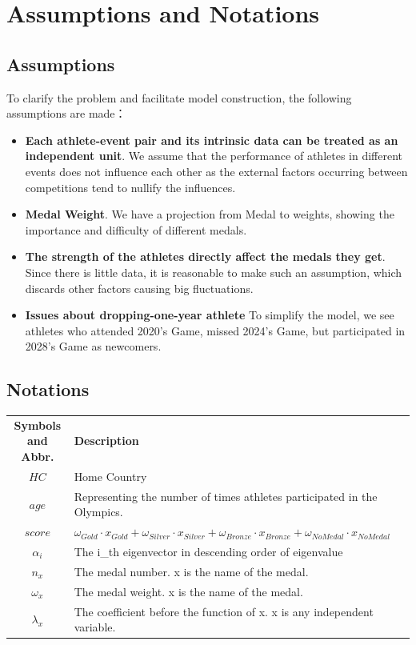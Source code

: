 \documentclass{mcmthesis}
\begin{document}
\section{Assumptions and Notations}

\subsection{Assumptions}

To clarify the problem and facilitate model construction, the following assumptions are made：

\begin{itemize}
\item {\bf Each athlete-event pair and its intrinsic data can be treated as an independent unit}. We assume that the performance of athletes in different events does not influence each other as the external factors occurring between competitions tend to nullify the influences.

\item  {\bf Medal Weight}. We have a projection from Medal to weights, showing the importance and difficulty of different medals. 

\item  {\bf The strength of the athletes directly affect the medals they get}. Since there is little data, it is reasonable to make such an assumption, which discards other factors causing big fluctuations.

\item  {\bf Issues about dropping-one-year athlete} To simplify the model, we see athletes who attended 2020's Game, missed 2024's Game, but participated in 2028's Game as newcomers.

\end{itemize}

\subsection{Notations}
\begin{center}
\begin{tabular}{clc}
{\bf Symbols and Abbr.} & {\bf Description} \\[0.25cm]
$HC$ & Home Country \\[0.2cm]
$age$ & Representing the number of times athletes participated in the Olympics. \\[0.2cm]
$score$ & $\omega_{Gold} \cdot x_{Gold} + \omega_{Silver} \cdot x_{Silver} + \omega_{Bronze} \cdot x_{Bronze} + \omega_{NoMedal} \cdot x_{NoMedal}$ \\[0.2cm]
$\alpha_i$ & The i\_th eigenvector in descending order of eigenvalue \\[0.2cm]
$n_x$ & The medal number. x is the name of the medal. \\[0.2cm]
$\omega_x$ & The medal weight. x is the name of the medal. \\[0.2cm]
$\lambda_x$ & The coefficient before the function of x. x is any independent variable.
\end{tabular}
\end{center}
\end{document}
